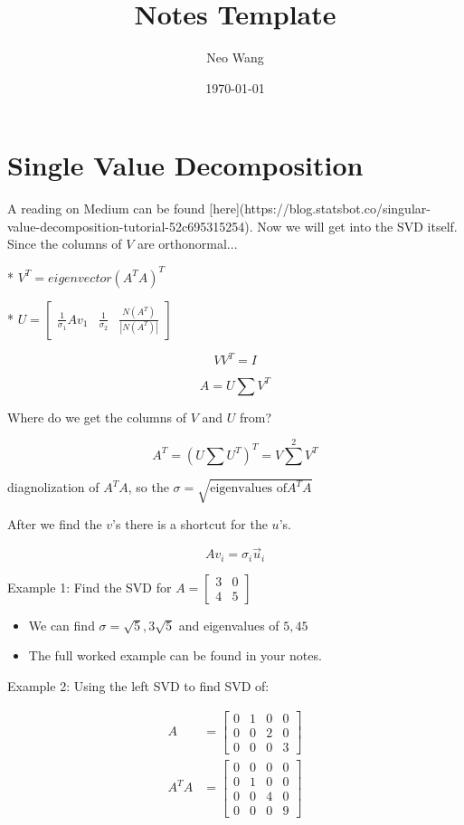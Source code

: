 \documentclass{article}
\title{Notes Template}
\author{Neo Wang}
\date{\today}
\begin{document}
\maketitle
\tableofcontents


\section{Single Value Decomposition}

\begin{markdown}

A reading on Medium can be found [here](https://blog.statsbot.co/singular-value-decomposition-tutorial-52c695315254). Now we will get into the SVD itself. Since the columns of $V$ are orthonormal...

* $V^T = eigenvector(A^TA)^T$

* $U = \begin{bmatrix}\frac{1}{\sigma_1}Av_1 & \frac{1}{\sigma_2} & \frac{N(A^T)}{|N(A^T)|}\end{bmatrix}$

$$VV^T=I$$

$$A = U\sum V^T$$

Where do we get the columns of $V$ and $U$ from?

$$A^T = (U\sum U^T)^T=V\sum^2 V^T$$

diagnolization of $A^TA$, so the $\sigma=\sqrt{\text{eigenvalues of}A^TA}$

\end{markdown}

After we find the $v$'s there is a shortcut for the $u$'s.

$$Av_i=\sigma_i\vec{u}_i$$

Example 1: Find the SVD for $A = \begin{bmatrix}
	3 & 0 \\4&5
\end{bmatrix}$

\begin{itemize}
	\item We can find $\sigma = \sqrt{5}, 3\sqrt{5}$ and eigenvalues of $5, 45$
	\item The full worked example can be found in your notes.
\end{itemize}

Example 2: Using the left SVD to find SVD of:

$$
\begin{aligned}
	A    & =
	\begin{bmatrix}
		0 & 1 & 0 & 0 \\0&0&2&0\\0&0&0&3
	\end{bmatrix} \\
	A^TA & =
	\begin{bmatrix}
		0 & 0 & 0 & 0 \\0&1&0&0\\0&0&4&0\\0&0&0&9
	\end{bmatrix} \\
\end{aligned}
$$
\end{document}

